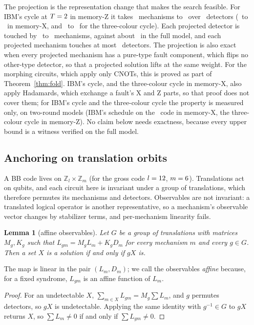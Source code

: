 \documentclass[aps,pra,twocolumn,superscriptaddress,nofootinbib,longbibliography,floatfix]{revtex4-2}
\newtheorem{lemma}{Lemma}
\begin{document}
The projection is the representation change that makes the search feasible. For IBM's cycle at $T=2$ in memory-Z it takes \IbmFullMechZ\ mechanisms to \IbmProjMech\ over \IbmProjDet\ detectors (\IbmFullMechX\ to \IbmProjMech\ in memory-X, and \TcFullMech\ to \IbmProjMech\ for the three-colour cycle). Each projected detector is touched by \ProjDetDegLo\ to \ProjDetDegHi\ mechanisms, against about \FullDetDeg\ in the full model, and each projected mechanism touches at most \ProjMechDegHi\ detectors. The projection is also exact when every projected mechanism has a pure-type fault component, which flips no other-type detector, so that a projected solution lifts at the same weight. For the morphing circuits, which apply only CNOTs, this is proved as part of Theorem~\ref{thm:fold}. IBM's cycle, and the three-colour cycle in memory-X, also apply Hadamards, which exchange a fault's X and Z parts, so that proof does not cover them; for IBM's cycle and the three-colour cycle the property is measured only, on two-round models (IBM's schedule on the \SmallCode\ code in memory-X, the three-colour cycle in memory-Z). No claim below needs exactness, because every upper bound is a witness verified on the full model.

\subsection{Anchoring on translation orbits}

A BB code lives on $\mathbb Z_l\times\mathbb Z_m$ (for the gross code $l=12$, $m=6$). Translations act on qubits, and each circuit here is invariant under a group of translations, which therefore permutes its mechanisms and detectors. Observables are not invariant: a translated logical operator is another representative, so a mechanism's observable vector changes by stabilizer terms, and per-mechanism linearity fails.

\begin{lemma}[affine observables]
Let $G$ be a group of translations with matrices $M_g,K_g$ such that $L_{gm}=M_gL_m+K_gD_m$ for every mechanism $m$ and every $g\in G$. Then a set $X$ is a solution if and only if $gX$ is.
\end{lemma}
The map is linear in the pair $(L_m,D_m)$; we call the observables \emph{affine} because, for a fixed syndrome, $L_{gm}$ is an affine function of $L_m$.
\begin{proof}
For an undetectable $X$, $\sum_{m\in X}L_{gm}=M_g\sum L_m$, and $g$ permutes detectors, so $gX$ is undetectable. Applying the same identity with $g^{-1}\in G$ to $gX$ returns $X$, so $\sum L_m\ne0$ if and only if $\sum L_{gm}\ne0$.
\end{proof}
\end{document}
